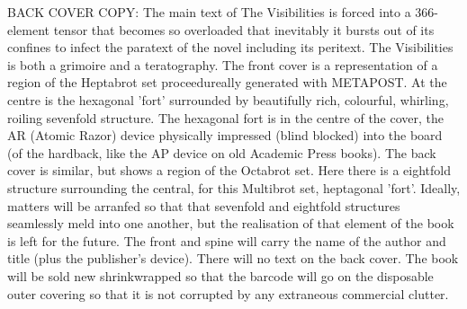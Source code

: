 BACK COVER COPY:
The main text of The Visibilities is forced into a 366-element tensor that becomes so overloaded that inevitably it bursts out of its confines to infect the paratext of the novel including its peritext. The Visibilities is both a grimoire and a teratography. The front cover is a representation of a region of the Heptabrot set proceedureally generated with METAPOST. At the centre is the hexagonal 'fort' surrounded by beautifully rich, colourful, whirling, roiling sevenfold structure. The hexagonal fort is in the centre of the cover, the AR (Atomic Razor) device physically impressed (blind blocked) into the board (of the hardback, like the AP device on old Academic Press books). The back cover is similar, but shows a region of the Octabrot set. Here there is a eightfold structure surrounding the central, for this Multibrot set, heptagonal 'fort'. Ideally, matters will be arranfed so that that sevenfold and eightfold structures seamlessly meld into one another, but the realisation of that element of the book is left for the future. The front and spine will carry the name of the author and title (plus the publisher's device). There will no text on the back cover. The book will be sold new shrinkwrapped so that the barcode will go on the disposable outer covering so that it is not corrupted by any extraneous commercial clutter.     
